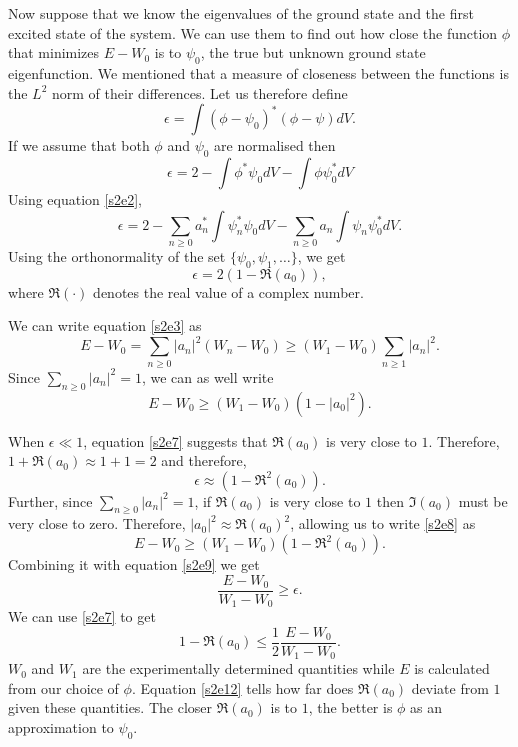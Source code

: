 \documentclass{article}
\numberwithin{equation}{section}
\begin{document}
Now suppose that we know the eigenvalues of the ground state and the first 
excited state of the system. We can use them to find out how close the 
function $\phi$ that minimizes $E - W_0$ is to $\psi_0$, the true but unknown
ground state eigenfunction. We mentioned that a measure of closeness between
the functions is the $L^2$ norm of their differences. Let us therefore define
\begin{equation}\label{s2e6}
\epsilon = \int (\phi - \psi_0)^\ast(\phi - \psi)dV.
\end{equation}
If we assume that both $\phi$ and $\psi_0$ are normalised then
\[
\epsilon = 2 - \int\phi^\ast\psi_0 dV - \int\phi\psi_0^\ast dV
\]
Using equation \eqref{s2e2},
\[
\epsilon = 2 - \sum_{n \ge 0}a_n^\ast\int\psi_n^\ast\psi_0 dV - \sum_{n \ge 0}a_n\int\psi_n\psi_0^\ast dV.
\]
Using the orthonormality of the set $\{\psi_0, \psi_1, \ldots\}$, we get
\begin{equation}\label{s2e7}
\epsilon = 2(1 - \Re(a_0)),
\end{equation}
where $\Re(\cdot)$ denotes the real value of a complex number. 

We can write equation \eqref{s2e3} as
\[
E - W_0 = \sum_{n \ge 0}|a_n|^2(W_n - W_0) \ge (W_1 - W_0)\sum_{n \ge 1}|a_n|^2.
\]
Since $\sum_{n \ge 0}|a_n|^2 = 1$, we can as well write
\begin{equation}\label{s2e8}
E - W_0 \ge (W_1 - W_0)(1 - |a_0|^2).
\end{equation}

When $\epsilon \ll 1$, equation \eqref{s2e7} suggests that $\Re(a_0)$ is very
close to $1$. Therefore, $1 + \Re(a_0) \approx 1 + 1 = 2$ and therefore,
\begin{equation}\label{s2e9}
\epsilon \approx (1 - \Re^2(a_0)).
\end{equation}
Further, since $\sum_{n \ge 0}|a_n|^2 = 1$, if $\Re(a_0)$ is very close to $1$
then $\Im(a_0)$ must be very close to zero. Therefore, $|a_0|^2 \approx
\Re(a_0)^2$, allowing us to write \eqref{s2e8} as
\begin{equation}\label{s2e10}
E - W_0 \ge (W_1 - W_0)(1 - \Re^2(a_0)).
\end{equation}
Combining it with equation \eqref{s2e9} we get
\begin{equation}\label{s2e11}
\frac{E - W_0}{W_1 - W_0} \ge \epsilon.
\end{equation}
We can use \eqref{s2e7} to get 
\begin{equation}\label{s2e12}
1 - \Re(a_0) \le \frac{1}{2}\frac{E - W_0}{W_1 - W_0}.
\end{equation}
$W_0$ and $W_1$ are the experimentally determined quantities while $E$ is
calculated from our choice of $\phi$. Equation \eqref{s2e12} tells how far
does $\Re(a_0)$ deviate from $1$ given these quantities. The closer $\Re(a_0)$
is to $1$, the better is $\phi$ as an approximation to $\psi_0$.
\end{document}
